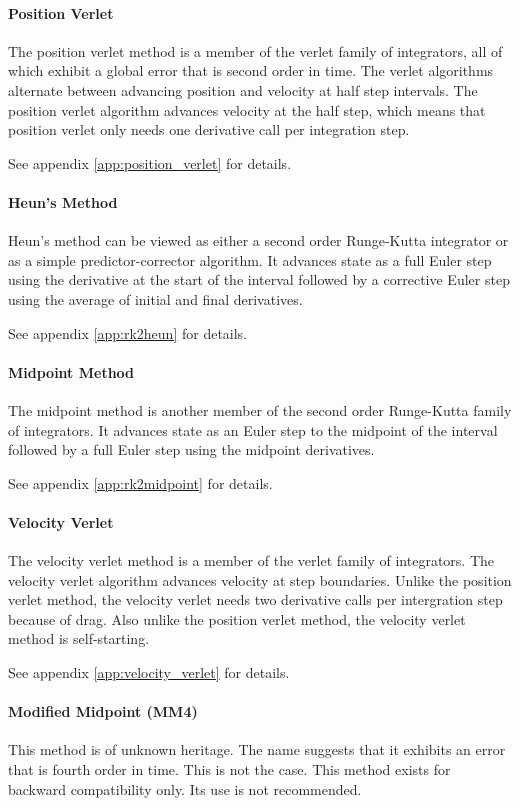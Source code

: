 \paragraph{Position Verlet}
The position verlet method is a member of the verlet family of integrators,
all of which exhibit a global error that is second order in time.
The verlet algorithms alternate between advancing position and velocity at
half step intervals. The position verlet algorithm advances velocity at the
half step, which means that position verlet only needs one derivative
call per integration step.

See appendix \ref{app:position_verlet} for details.

\paragraph{Heun's Method}
Heun's method can be viewed as either a second order Runge-Kutta integrator
or as a simple predictor-corrector algorithm. It advances state as a full
Euler step using the derivative at the start of the interval
followed by a corrective Euler step using the average of initial and final
derivatives.

See appendix \ref{app:rk2heun} for details.

\paragraph{Midpoint Method}
The midpoint method is another member of the second order Runge-Kutta family
of integrators. It advances state as an Euler step to the midpoint of the
interval followed by a full Euler step using the midpoint derivatives.

See appendix \ref{app:rk2midpoint} for details.

\paragraph{Velocity Verlet}
The velocity verlet method is a member of the verlet family of integrators.
The velocity verlet algorithm advances velocity at step boundaries.
Unlike the position verlet method, the velocity verlet needs two derivative
calls per intergration step because of drag. Also unlike the position verlet
method, the velocity verlet method is self-starting.

See appendix \ref{app:velocity_verlet} for details.

\paragraph{Modified Midpoint (MM4)}
This method is of unknown heritage. The name suggests that it exhibits an
error that is fourth order in time. This is not the case.
This method exists for backward compatibility only. Its use is not recommended.

